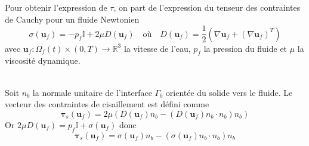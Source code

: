\documentclass[11pt, a4paper, oneside]{report}
\begin{document}
\begin{samepage}
Pour obtenir l'expression de $\tau$, on part de l'expression du tenseur des contraintes de Cauchy pour un fluide Newtonien
\begin{equation}
    \sigma(\bm{u}_f) = -p_f \mathbb{I} + 2 \mu D(\bm{u}_f) \quad \text{où} \quad D(\bm{u}_f) = \frac{1}{2} \left( \nabla \bm{u}_f + (\nabla \bm{u}_f)^T \right)
\end{equation}
avec $\bm{u}_f : \Omega_f(t) \times (0, T) \longrightarrow \mathbb{R}^3$ la vitesse de l'eau, $p_f$ la pression du fluide et $\mu$ la viscosité dynamique.
\end{samepage} \\
Soit $n_b$ la normale unitaire de l'interface $\Gamma_b$ orientée du solide vers le fluide. Le vecteur des contraintes de cisaillement est défini comme
\begin{equation}
    \bm{\tau}_s(\bm{u}_f) = 2 \mu \left( D(\bm{u}_f) n_b - (D(\bm{u}_f)n_b \cdot n_b) n_b \right)
\end{equation}
Or $2 \mu D(\bm{u}_f) = p_f \mathbb{I} + \sigma(\bm{u}_f)$ donc
\begin{equation}
    \bm{\tau}_s(\bm{u}_f) = \sigma(\bm{u}_f) n_b - \left( \sigma(\bm{u}_f) n_b \cdot n_b \right) n_b
\end{equation}
\end{document}
